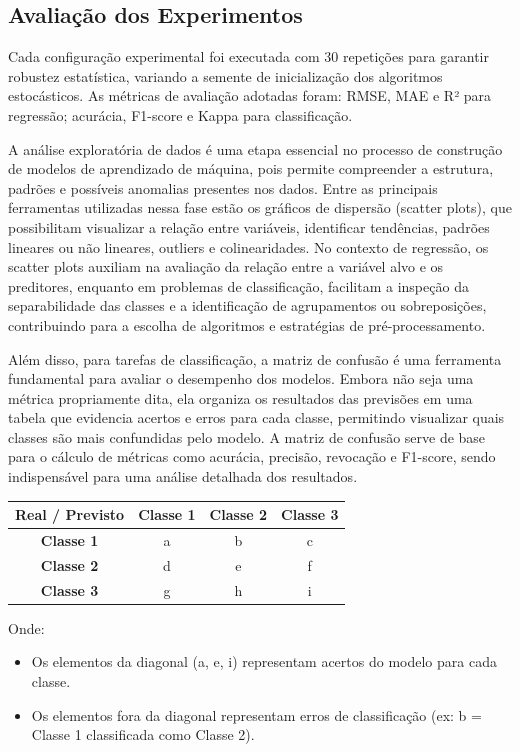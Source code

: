 \subsection{Avaliação dos Experimentos}

Cada configuração experimental foi executada com 30 repetições para garantir robustez estatística, variando a semente de inicialização dos algoritmos estocásticos. As métricas de avaliação adotadas foram: RMSE, MAE e R² para regressão; acurácia, F1-score e Kappa para classificação.

A análise exploratória de dados é uma etapa essencial no processo de construção de modelos de aprendizado de máquina, pois permite compreender a estrutura, padrões e possíveis anomalias presentes nos dados. Entre as principais ferramentas utilizadas nessa fase estão os gráficos de dispersão (scatter plots), que possibilitam visualizar a relação entre variáveis, identificar tendências, padrões lineares ou não lineares, outliers e colinearidades. No contexto de regressão, os scatter plots auxiliam na avaliação da relação entre a variável alvo e os preditores, enquanto em problemas de classificação, facilitam a inspeção da separabilidade das classes e a identificação de agrupamentos ou sobreposições, contribuindo para a escolha de algoritmos e estratégias de pré-processamento\cite{asimov2024}.

Além disso, para tarefas de classificação, a matriz de confusão é uma ferramenta fundamental para avaliar o desempenho dos modelos. Embora não seja uma métrica propriamente dita, ela organiza os resultados das previsões em uma tabela que evidencia acertos e erros para cada classe, permitindo visualizar quais classes são mais confundidas pelo modelo. A matriz de confusão serve de base para o cálculo de métricas como acurácia, precisão, revocação e F1-score, sendo indispensável para uma análise detalhada dos resultados\cite{mariano2021}.

\begin{center}
\begin{tabular}{|c|c|c|c|}
\hline
\textbf{Real / Previsto} & \textbf{Classe 1} & \textbf{Classe 2} & \textbf{Classe 3} \\
\hline
\textbf{Classe 1} & a & b & c \\
\hline
\textbf{Classe 2} & d & e & f \\
\hline
\textbf{Classe 3} & g & h & i \\
\hline
\end{tabular}
\end{center}
\vspace{0.2cm}
\vspace{0.2cm}
\noindent
Onde:
\begin{itemize}
    \item Os elementos da diagonal (a, e, i) representam acertos do modelo para cada classe.
    \item Os elementos fora da diagonal representam erros de classificação (ex: b = Classe 1 classificada como Classe 2).
\end{itemize}

